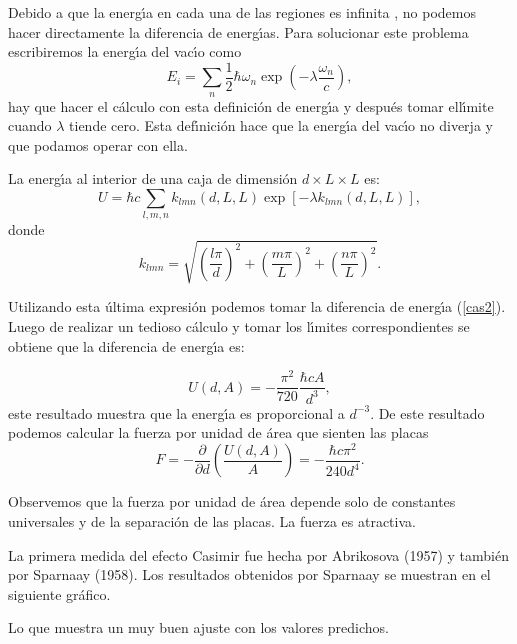 Debido a que la energ\'{\i}a en cada una de las regiones es infinita , no
podemos hacer directamente la diferencia de energ\'{\i}as. Para solucionar
este problema escribiremos la energ\'{\i}a del vac\'{\i}o como
\begin{equation}
E_{i}=\underset{n}{\sum}\frac{1}{2}\hbar\omega_{n}\exp\left(  -\lambda
\frac{\omega_{n}}{c}\right)  , \label{cas3}%
\end{equation}
hay que hacer el c\'{a}lculo con esta definici\'{o}n de energ\'{\i}a y
despu\'{e}s tomar ell\'{\i}mite cuando $\lambda$ tiende cero. Esta
def\'{\i}nici\'{o}n hace que la energ\'{\i}a del vac\'{\i}o no diverja y que
podamos operar con ella.

La energ\'{\i}a al interior de una caja de dimensi\'{o}n $d\times L\times L$
es:
\begin{equation}
U=\hbar c\underset{l,m,n}{\sum}k_{lmn}\left(  d,L,L\right)  \exp\left[
-\lambda k_{lmn}\left(  d,L,L\right)  \right]  , \label{cas4}%
\end{equation}
donde
\begin{equation}
k_{lmn}=\sqrt{\left(  \frac{l\pi}{d}\right)  ^{2}+\left(  \frac{m\pi}%
{L}\right)  ^{2}+\left(  \frac{n\pi}{L}\right)  ^{2}}. \label{cas5}%
\end{equation}


Utilizando esta \'{u}ltima expresi\'{o}n podemos tomar la diferencia de
energ\'{\i}a (\ref{cas2}). Luego de realizar un tedioso c\'{a}lculo y tomar
los l\'{\i}mites correspondientes se obtiene que la diferencia de energ\'{\i}a
es:%

\[
U\left(  d,A\right)  =-\frac{\pi^{2}}{720}\frac{\hbar cA}{d^{3}},
\]
este resultado muestra que la energ\'{\i}a es proporcional a $d^{-3}$. De este
resultado podemos calcular la fuerza por unidad de \'{a}rea que sienten las
placas
\[
F=-\frac{\partial}{\partial d}\left(  \frac{U\left(  d,A\right)  }{A}\right)
=-\frac{\hbar c\pi^{2}}{240d^{4}}.
\]


Observemos que la fuerza por unidad de \'{a}rea depende solo de constantes
universales y de la separaci\'{o}n de las placas. La fuerza es atractiva.

La primera medida del efecto Casimir fue hecha por Abrikosova (1957) y
tambi\'{e}n por Sparnaay (1958). Los resultados obtenidos por Sparnaay se
muestran en el siguiente gr\'{a}fico.

\smallskip

Lo que muestra un muy buen ajuste con los valores predichos.

